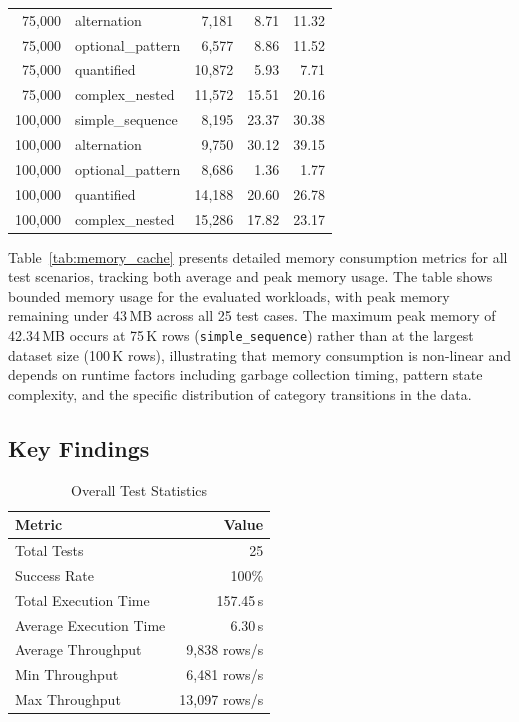 {\begin{longtable}{@{\extracolsep{\fill}}rlrrr}
 75{,}000 & alternation       & 7{,}181 &  8.71 & 11.32 \\
 75{,}000 & optional\_pattern & 6{,}577 &  8.86 & 11.52 \\
 75{,}000 & quantified        & 10{,}872 &  5.93 &  7.71 \\
 75{,}000 & complex\_nested   & 11{,}572 & 15.51 & 20.16 \\
\midrule
100{,}000 & simple\_sequence  &  8{,}195 & 23.37 & 30.38 \\
100{,}000 & alternation       &  9{,}750 & 30.12 & 39.15 \\
100{,}000 & optional\_pattern &  8{,}686 &  1.36 &  1.77 \\
100{,}000 & quantified        & 14{,}188 & 20.60 & 26.78 \\
100{,}000 & complex\_nested   & 15{,}286 & 17.82 & 23.17 \\
\end{longtable}
}

Table~\ref{tab:memory_cache} presents detailed memory consumption
metrics for all test scenarios, tracking both average and peak memory
usage.  The table shows bounded memory usage for the evaluated
workloads, with peak memory remaining under 43\,MB across all 25 test
cases.  The maximum peak memory of 42.34\,MB occurs at 75\,K
rows (\texttt{simple\_sequence}) rather than at the largest dataset
size (100\,K rows), illustrating that memory consumption is
non-linear and depends on runtime factors including garbage
collection timing, pattern state complexity, and the specific
distribution of category transitions in the data.

\subsection{Key Findings}
\label{subsec:eval-key-findings}

\begin{table}[H]
\centering
\caption{Overall Test Statistics}
\label{tab:overall_stats}
\begin{tabular}{lr}
\toprule
\textbf{Metric} & \textbf{Value} \\
\midrule
Total Tests             & 25 \\
Success Rate            & 100\% \\
Total Execution Time    & 157.45\,s \\
Average Execution Time  & 6.30\,s \\
Average Throughput      & 9{,}838 rows/s \\
Min Throughput          & 6{,}481 rows/s \\
Max Throughput          & 13{,}097 rows/s \\
\bottomrule
\end{tabular}
\end{table}

